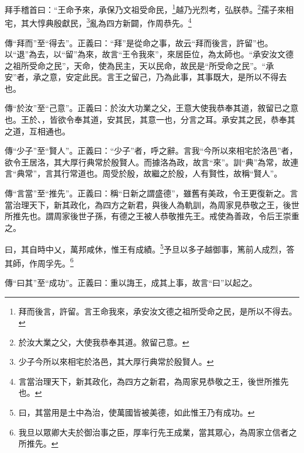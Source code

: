 拜手稽首曰：“王命予來，承保乃文祖受命民，\footnote{拜而後言，許留。言王命我來，承安汝文德之祖所受命之民，是所以不得去。}越乃光烈考，弘朕恭。\footnote{於汝大業之父，大使我恭奉其道。敘留己意。}孺子來相宅，其大惇典殷獻民，\footnote{少子今所以來相宅於洛邑，其大厚行典常於殷賢人。}亂為四方新闢，作周恭先。\footnote{言當治理天下，新其政化，為四方之新君，為周家見恭敬之王，後世所推先也。}


{\noindent\zhuan{}\fzbyks 傳“拜而”至“得去”。正義曰：“拜”是從命之事，故云“拜而後言，許留”也。以“退”為去，以“留”為來，故言“王令我來”，來居臣位，為太師也。“承安汝文德之祖所受命之民”，天命，使為民主，天以民命，故民是“所受命之民”。“承安”者，承之意，安定此民。言王之留己，乃為此事，其事既大，是所以不得去也。 \par}

{\noindent\zhuan{}\fzbyks 傳“於汝”至“己意”。正義曰：於汝大功業之父，王意大使我恭奉其道，敘留已之意也。王於、，皆欲令奉其道，安其民，其意一也，分言之耳。承安其之民，恭奉其之道，互相通也。 \par}

{\noindent\zhuan{}\fzbyks 傳“少子”至“賢人”。正義曰：“少子”者，呼之辭。言我“今所以來相宅於洛邑”者，欲令王居洛，其大厚行典常於殷賢人。而據洛為政，故言“來”。訓“典”為常，故連言“典常”，言其行常道也。周受於殷，故繼之於殷，人有賢性，故稱“賢人”。 \par}

{\noindent\zhuan{}\fzbyks 傳“言當”至“推先”。正義曰：稱“日新之謂盛德”，雖舊有美政，令王更復新之。言當治理天下，新其政化，為四方之新君，與後人為軌訓，為周家見恭敬之王，後世所推先也。謂周家後世子孫，有德之王被人恭敬推先王。戒使為善政，令后王崇重之。 \par}

曰，其自時中乂，萬邦咸休，惟王有成績。\footnote{曰，其當用是土中為治，使萬國皆被美德，如此惟王乃有成功。}予旦以多子越御事，篤前人成烈，答其師，作周孚先。\footnote{我旦以眾卿大夫於御治事之臣，厚率行先王成業，當其眾心，為周家立信者之所推先。}

{\noindent\zhuan{}\fzbyks 傳“曰其”至“成功”。正義曰：重以誨王，成其上事，故言“曰”以起之。 \par}

